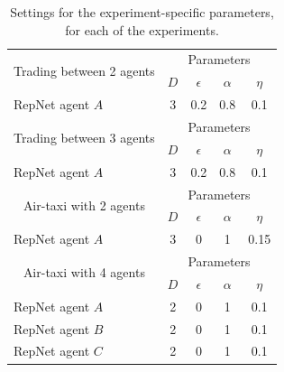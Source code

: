 \begin{table}[h]
\centering
\begin{tabular}{c c c c c}
    \toprule
    \midrule
    \multirow{2}[4]{*}{Trading between 2 agents} & \multicolumn{4}{c}{Parameters}\\ 
    \cmidrule(rl){2-5}
    & $D$  & $\epsilon$ & $\alpha$ & $\eta$ \\ 
    \cmidrule(r){1-1}\cmidrule(l){2-5}
    \multicolumn{1}{l}{RepNet agent $A$}& 3 & 0.2 & 0.8 & 0.1   \\
    \midrule
    
    \multirow{2}[4]{*}{Trading between 3 agents} & \multicolumn{4}{c}{Parameters}\\ 
    \cmidrule(rl){2-5}
    & $D$  & $\epsilon$ & $\alpha$ & $\eta$  \\ 
    \cmidrule(r){1-1}\cmidrule(l){2-5}
    \multicolumn{1}{l}{RepNet agent $A$}& 3 & 0.2 & 0.8 & 0.1   \\
    \midrule
    
    \multirow{2}[4]{*}{Air-taxi with 2 agents} & \multicolumn{4}{c}{Parameters}\\ 
    \cmidrule(rl){2-5}
    & $D$  & $\epsilon$ & $\alpha$ & $\eta$  \\ 
    \cmidrule(r){1-1}\cmidrule(l){2-5}
    \multicolumn{1}{l}{RepNet agent $A$}& 3 & 0 & 1 & 0.15   \\
    \midrule
    
    \multirow{2}[4]{*}{Air-taxi with 4 agents} & \multicolumn{4}{c}{Parameters}\\ 
    \cmidrule(rl){2-5}
    & $D$  & $\epsilon$ & $\alpha$ & $\eta$   \\ 
    \cmidrule(r){1-1}\cmidrule(l){2-5}
    \multicolumn{1}{l}{RepNet agent $A$}& 2 & 0 & 1 & 0.1   \\
    \multicolumn{1}{l}{RepNet agent $B$}& 2 & 0 & 1 & 0.1   \\
    \multicolumn{1}{l}{RepNet agent $C$}& 2 & 0 & 1 & 0.1   \\
    \midrule
    \bottomrule
\end{tabular}
\caption{Settings for the experiment-specific parameters, for each of the experiments.}
\label{tab:t1}
\end{table}
